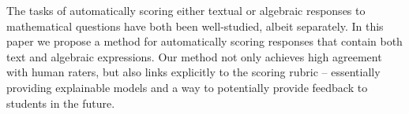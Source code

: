 The tasks of automatically scoring either textual or algebraic responses to mathematical questions have both been well-studied, albeit separately. In this paper we propose a method for automatically scoring responses that contain both text and algebraic expressions. Our method not only achieves high agreement with human raters, but also links explicitly to the scoring rubric -- essentially providing explainable models and a way to potentially provide feedback to students in the future.

